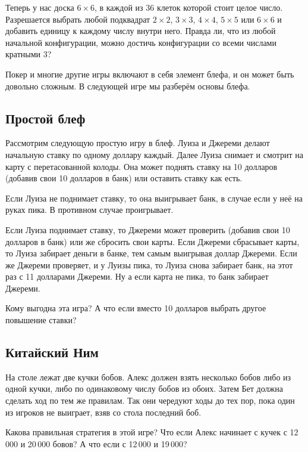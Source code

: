 Теперь у нас доска $6 \times 6$, в каждой из $36$ клеток которой стоит целое число.
Разрешается выбрать любой подквадрат $2 \times 2$, $3 \times 3$, $4 \times 4$, $5 \times 5$ или $6 \times 6$ и добавить единицу к каждому числу внутри него.
Правда ли, что из любой начальной конфигурации, можно достичь конфигурации со всеми числами кратными $3$?


\medskip

Покер и многие другие игры включают в себя элемент блефа, и он может быть довольно сложным.
В следующей игре мы разберём основы блефа.

\subsection*{Простой блеф}

Рассмотрим следующую простую игру в блеф.
Луиза и Джереми делают начальную ставку по одному доллару каждый.
Далее Луиза снимает и смотрит на карту с перетасованной колоды.
Она может поднять ставку на 10 долларов (добавив свои 10 долларов в банк) или оставить ставку как есть.

Если Луиза не поднимает ставку, то она выигрывает банк, в случае если у неё на руках пика.
В противном случае проигрывает.

Если Луиза поднимает ставку, то Джереми может проверить (добавив свои 10 долларов в банк) или же сбросить свои карты.
Если Джереми сбрасывает карты, то Луиза забирает деньги в банке, тем самым выигрывая доллар Джереми.
Если же Джереми проверяет, и у Луизы пика, то Луиза снова забирает банк, на этот раз с 11 долларами Джереми.
Ну а если карта не пика, то банк забирает Джереми.

Кому выгодна эта игра?
А что если вместо 10 долларов выбрать другое повышение ставки?

\subsection*{Китайский Ним}

На столе лежат две кучки бобов.
Алекс должен взять несколько бобов либо из одной кучки, либо по одинаковому числу бобов из обоих.
Затем Бет должна сделать ход по тем же правилам.
Так они чередуют ходы до тех пор, пока один из игроков не выиграет, взяв со стола последний боб.

Какова правильная стратегия в этой игре?
Что если Алекс начинает с кучек с 12\,000 и 20\,000 бовов?
А что если с 12\,000 и 19\,000?
